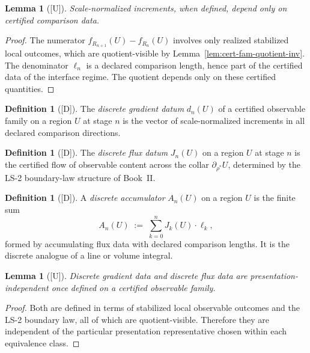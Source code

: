 \documentclass[12pt,oneside]{amsbook}
\theoremstyle{plain}
\newtheorem{lemma}[theorem]{Lemma}
\theoremstyle{definition}
\newtheorem{definition}[theorem]{Definition}
\theoremstyle{remark}
\newcommand{\status}[1]{\textup{[#1]}}
\begin{document}
\begin{lemma}[\status{U}]\label{lem:increment-welldef}
Scale-normalized increments, when defined, depend only on certified
comparison data.
\end{lemma}

\begin{proof}
The numerator $f_{R_{n+1}}(U) - f_{R_n}(U)$ involves only realized
stabilized local outcomes, which are quotient-visible by
Lemma~\ref{lem:cert-fam-quotient-inv}.  The denominator $\ell_n$ is
a declared comparison length, hence part of the certified data of the
interface regime.  The quotient depends only on these certified
quantities.
\end{proof}

\begin{definition}[\status{D}]\label{def:discrete-gradient}
The \emph{discrete gradient datum} $d_n(U)$ of a certified observable
family on a region $U$ at stage $n$ is the vector of scale-normalized
increments in all declared comparison directions.
\end{definition}

\begin{definition}[\status{D}]\label{def:discrete-flux}
The \emph{discrete flux datum} $J_n(U)$ on a region $U$ at stage $n$
is the certified flow of observable content across the collar
$\partial_{\rho^*} U$, determined by the LS-2 boundary-law structure
of Book~II.
\end{definition}

\begin{definition}[\status{D}]\label{def:discrete-accumulator}
A \emph{discrete accumulator} $A_n(U)$ on a region $U$ is the finite
sum
\[
  A_n(U) \;:=\; \sum_{k=0}^{n} J_k(U) \cdot \ell_k,
\]
formed by accumulating flux data with declared comparison lengths.
It is the discrete analogue of a line or volume integral.
\end{definition}

\begin{lemma}[\status{U}]\label{lem:flux-pres-ind}
Discrete gradient data and discrete flux data are
presentation-independent once defined on a certified observable
family.
\end{lemma}

\begin{proof}
Both are defined in terms of stabilized local observable outcomes and
the LS-2 boundary law, all of which are quotient-visible.  Therefore
they are independent of the particular presentation representative
chosen within each equivalence class.
\end{proof}
\end{document}
